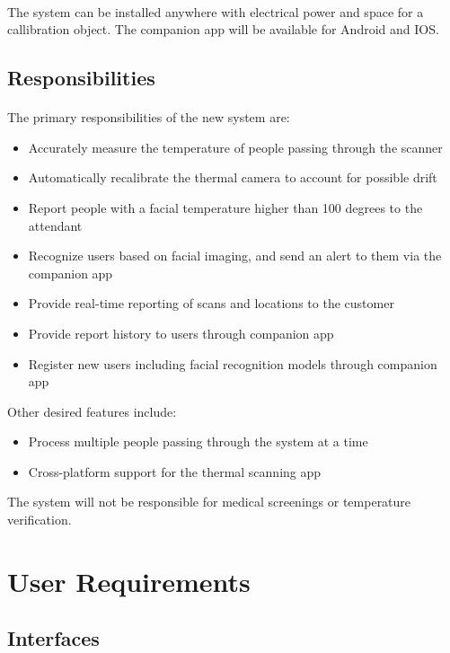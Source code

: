 \documentclass[12pt, letterpaper]{article}
\begin{document}
    \paragraph{}
    The system can be installed anywhere with electrical power and space for a callibration object. The companion app
    will be available for Android and IOS.
    \subsection{Responsibilities}
    \paragraph{}
    The primary responsibilities of the new system are:
    \begin{itemize}
        \item Accurately measure the temperature of people passing through the scanner
        \item Automatically recalibrate the thermal camera to account for possible drift
        \item Report people with a facial temperature higher than 100 degrees to the attendant
        \item Recognize users based on facial imaging, and send an alert to them via the companion app
        \item Provide real-time reporting of scans and locations to the customer
        \item Provide report history to users through companion app
        \item Register new users including facial recognition models through companion app 
    \end{itemize}
    Other desired features include:
    \begin{itemize}
        \item Process multiple people passing through the system at a time
        \item Cross-platform support for the thermal scanning app
    \end{itemize}
    The system will not be responsible for medical screenings or temperature verification.
    \newpage
    \section{User Requirements}
    \subsection{Interfaces}
\end{document}
